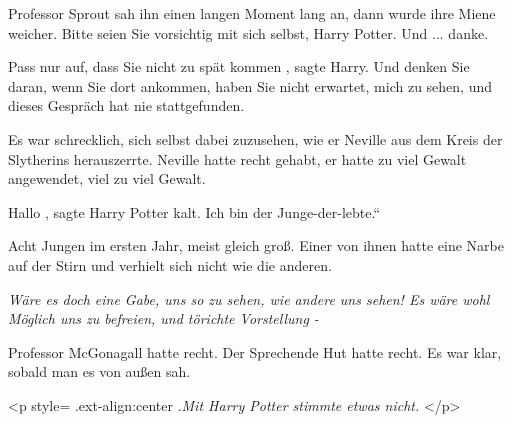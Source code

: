 Professor Sprout sah ihn einen langen Moment lang an, dann wurde ihre Miene
weicher. \glqq Bitte seien Sie vorsichtig mit sich selbst, Harry Potter. Und ...
danke.\grqq{}

\glqq Pass nur auf, dass Sie nicht zu spät kommen\grqq{} , sagte Harry. \glqq
Und denken Sie daran, wenn Sie dort ankommen, haben Sie nicht erwartet, mich zu
sehen, und dieses Gespräch hat nie stattgefunden.\grqq{}

Es war schrecklich, sich selbst dabei zuzusehen, wie er Neville aus dem Kreis
der Slytherins herauszerrte. Neville hatte recht gehabt, er hatte zu viel Gewalt
angewendet, viel zu viel Gewalt.

\glqq Hallo\grqq{} , sagte Harry Potter kalt. \glqq Ich bin der
Junge-der-lebte.“

Acht Jungen im ersten Jahr, meist gleich groß. Einer von ihnen hatte eine Narbe
auf der Stirn und verhielt sich nicht wie die anderen.

\emph{Wäre es doch eine Gabe, uns so zu sehen, wie andere uns sehen! Es wäre
wohl Möglich uns zu befreien, und törichte Vorstellung - }

Professor McGonagall hatte recht. Der Sprechende Hut hatte recht. Es war klar,
sobald man es von außen sah.

<p style=\grqq{} .ext-align:center\grqq{} .\emph{Mit Harry Potter stimmte etwas
nicht. }</p>
